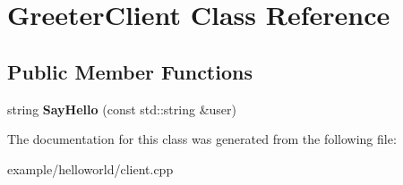 \hypertarget{classGreeterClient}{}\section{Greeter\+Client Class Reference}
\label{classGreeterClient}
\subsection*{Public Member Functions}
\begin{DoxyCompactItemize}
\item 
\mbox{\label{classGreeterClient_a673a567cdce22eeed0afaf48bf808fa8}} 
string {\bfseries Say\+Hello} (const std\+::string \&user)
\end{DoxyCompactItemize}


The documentation for this class was generated from the following file\+:\begin{DoxyCompactItemize}
\item 
example/helloworld/client.\+cpp\end{DoxyCompactItemize}
